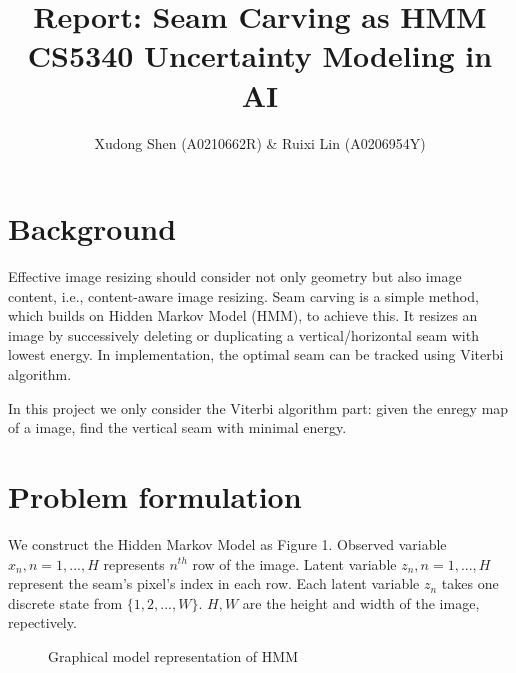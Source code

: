 \documentclass{article}
\begin{document}
\title{Report: Seam Carving as HMM \\ CS5340 Uncertainty Modeling in AI}
\author{Xudong Shen (A0210662R) \& Ruixi Lin (A0206954Y)}
\maketitle

\section*{Background}
	Effective image resizing should consider not only geometry but also image content, i.e., content-aware image resizing. Seam carving \cite{SeamCarving} is a simple method, which builds on Hidden Markov Model (HMM), to achieve this. It resizes an image by successively deleting or duplicating a vertical/horizontal seam with lowest energy. In implementation, the optimal seam can be tracked using Viterbi algorithm.

	In this project we only consider the Viterbi algorithm part: given the enregy map of a image, find the vertical seam with minimal energy.

\section*{Problem formulation}
	We construct the Hidden Markov Model as Figure 1. Observed variable $x_{n}, n=1, ..., H$ represents $n^{th}$ row of the image. Latent variable $z_{n}, n=1, ..., H$ represent the seam's pixel's index in each row. Each latent variable $z_{n}$ takes one discrete state from $\{1, 2, ..., W\}$. $H, W$ are the height and width of the image, repectively.

	\begin{figure}[htbp]
	\begin{center}
    \end{center}
    \caption{Graphical model representation of HMM}
    \end{figure}
\end{document}
